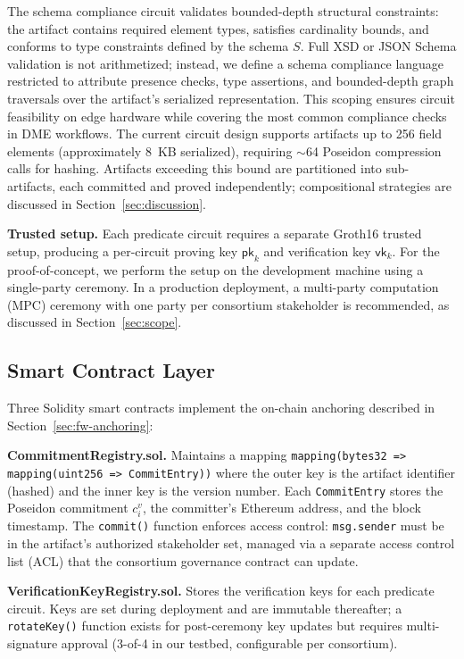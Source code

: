 The schema compliance circuit validates bounded-depth structural constraints: the artifact contains required element types, satisfies cardinality bounds, and conforms to type constraints defined by the schema $S$.
Full XSD or JSON Schema validation is not arithmetized; instead, we define a schema compliance language restricted to attribute presence checks, type assertions, and bounded-depth graph traversals over the artifact's serialized representation.
This scoping ensures circuit feasibility on edge hardware while covering the most common compliance checks in DME workflows.
The current circuit design supports artifacts up to 256 field elements (approximately 8~KB serialized), requiring $\sim$64 Poseidon compression calls for hashing.
Artifacts exceeding this bound are partitioned into sub-artifacts, each committed and proved independently; compositional strategies are discussed in Section~\ref{sec:discussion}.

\textbf{Trusted setup.}
Each predicate circuit requires a separate Groth16 trusted setup, producing a per-circuit proving key $\mathsf{pk}_k$ and verification key $\mathsf{vk}_k$.
For the proof-of-concept, we perform the setup on the development machine using a single-party ceremony.
In a production deployment, a multi-party computation (MPC) ceremony with one party per consortium stakeholder is recommended, as discussed in Section~\ref{sec:scope}.

\subsection{Smart Contract Layer}
\label{sec:arch-contracts}

Three Solidity smart contracts implement the on-chain anchoring described in Section~\ref{sec:fw-anchoring}:

\textbf{CommitmentRegistry.sol.}
Maintains a mapping \texttt{mapping(bytes32 => mapping(uint256 => CommitEntry))} where the outer key is the artifact identifier (hashed) and the inner key is the version number.
Each \texttt{CommitEntry} stores the Poseidon commitment $c_i^{v}$, the committer's Ethereum address, and the block timestamp.
The \texttt{commit()} function enforces access control: \texttt{msg.sender} must be in the artifact's authorized stakeholder set, managed via a separate access control list (ACL) that the consortium governance contract can update.

\textbf{VerificationKeyRegistry.sol.}
Stores the verification keys for each predicate circuit.
Keys are set during deployment and are immutable thereafter; a \texttt{rotateKey()} function exists for post-ceremony key updates but requires multi-signature approval (3-of-4 in our testbed, configurable per consortium).

